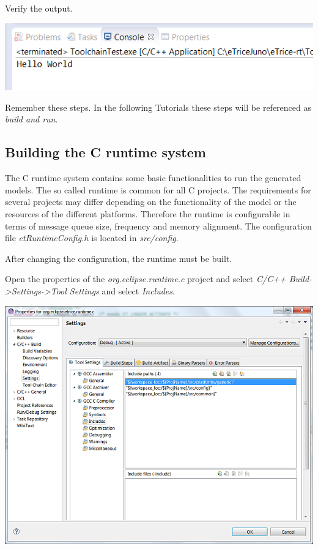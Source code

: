 Verify the output.

\includegraphics{images/014-SetupWorkspaceC07.png}

Remember these steps. In the following Tutorials these steps will be referenced as \textit{build and run}.


\subsection{Building the C runtime system}

The C runtime system contains some basic functionalities to run the generated models. The so called 
runtime is common for all C projects. The requirements for several projects may differ depending on the 
functionality of the model or the resources of the different platforms. Therefore the runtime is 
configurable in terms of message queue size, frequency and memory alignment. The configuration file 
\textit{etRuntimeConfig.h} is located in \textit{src/config}.

After changing the configuration, the runtime must be built.

Open the properties of the \textit{org.eclipse.runtime.c} project and select \textit{C/C++ 
Build->Settings->Tool Settings} and select \textit{Includes}.

\includegraphics{images/014-SetupWorkspaceC08.png}


